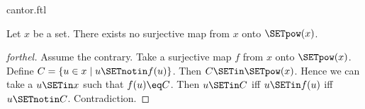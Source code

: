 \documentclass{stex}
\begin{document}
\begin{smodule}{cantor.ftl}

\begin{theorem}[forthel,title=Cantor's Theorem,id=cantor_017529138285230]
  Let $x$ be a set.
  There exists no surjective map from $x$ onto $\SETpow(x)$.
\end{theorem}
\begin{proof}[forthel]
  Assume the contrary.
  Take a surjective map $f$ from $x$ onto $\SETpow(x)$.
  Define $C = \{ u \in x \mid u \SETnotin f(u) \}$.
  Then $C \SETin \SETpow(x)$.
  Hence we can take a $u \SETin x$ such that $f(u) \eq C$.
  Then $u \SETin C$ iff $u \SETin f(u)$ iff $u \SETnotin C$.
  Contradiction.
\end{proof}
\end{smodule}
\end{document}

